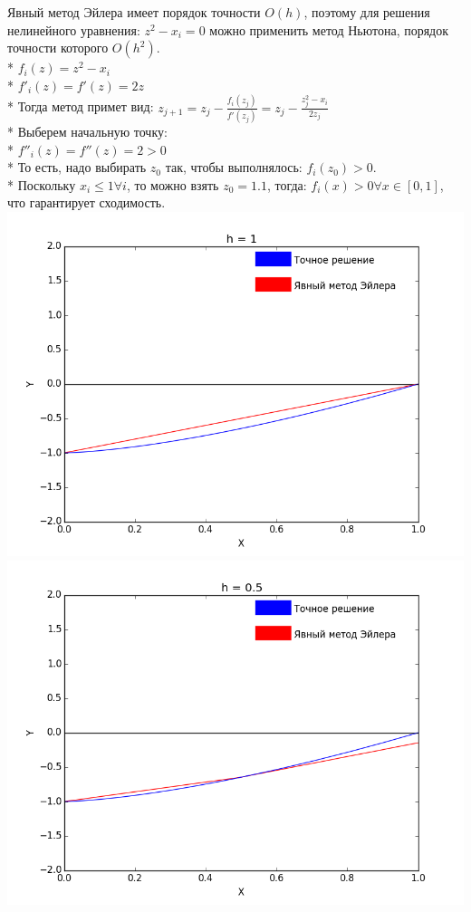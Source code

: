 \documentclass[12pt,a4paper]{article}
\begin{document}
        \noindent
        Явный метод Эйлера имеет порядок точности $O(h)$, поэтому для решения
        нелинейного уравнения: $z^{2} - x_{i} = 0$ можно применить метод Ньютона,
        порядок точности которого $O(h^{2})$.\\*
        $f_{i}(z) = z^{2} - x_{i}$\\*
        $f'_{i}(z) = f'(z) = 2z$\\*
        Тогда метод примет вид: $z_{j+1} = z_{j} - \frac{f_{i}(z_{j})}{f'(z_{j})} =
        z_{j} - \frac{z_{j}^{2} - x_{i}}{2z_{j}}$\\*
        Выберем начальную точку:\\*
        $f''_{i}(z) = f''(z) = 2 > 0$\\*
        То есть, надо выбирать $z_{0}$ так, чтобы выполнялось: $f_{i}(z_{0}) > 0$.\\*
        Поскольку $x_{i} \leq 1 \forall i$, то можно взять $z_{0} = 1.1$, тогда:
        $f_{i}(x) > 0 \forall x \in [0, 1]$, что гарантирует сходимость.
        \includegraphics[scale=0.45]{explicitEulerGraph_Step=1}
        \includegraphics[scale=0.45]{explicitEulerGraph_Step=0_5}\\
\end{document}
